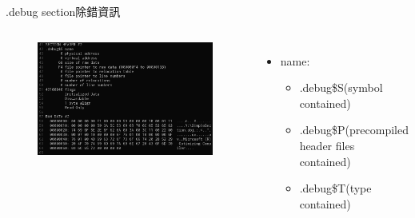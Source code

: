 \begin{frame}{.debug section}{除錯資訊}
    \begin{columns}[t]
        \begin{figure}
            \begin{center}
                \includegraphics[width=\textwidth]{./image/debugsec.png}
            \end{center}
        \end{figure}
        \begin{itemize}
            \item name:
            \begin{itemize}
            \item .debug\$S(symbol contained)
            \item .debug\$P(precompiled header files contained) 
            \item .debug\$T(type contained)
            \end{itemize}
        \end{itemize}
    \end{columns}
\end{frame}


